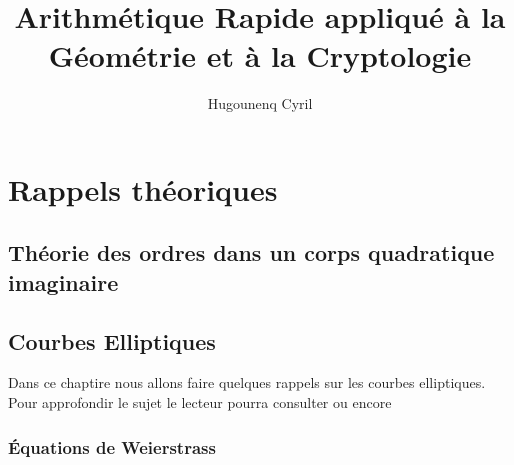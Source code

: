 \documentclass[10pt,a4paper]{book}
\author{Hugounenq Cyril}
\title{Arithmétique Rapide appliqué à la Géométrie et à la Cryptologie}
\theoremstyle{plain}
\theoremstyle{definition}
\theoremstyle{definition}
\theoremstyle{definition}
\theoremstyle{definition}
\theoremstyle{remark}
\theoremstyle{remark}
\begin{document}
\fancyhf{}%
\fancyhead[L]{\nouppercase\leftmark}%
\fancyhead[R]{}
\fancyfoot[C]{\thepage}%
\fancyfoot[L]{}




\renewcommand{\headrulewidth}{1pt}%
\renewcommand{\headrule}{\hbox to\headwidth{%
  \color{orange}\leaders\hrule height \headrulewidth\hfill}}
  
\renewcommand{\footrulewidth}{1pt}%
\newcommand{\footrulecolor}{blue}


\setlength{\parskip}{-1pt plus 1pt}

\newcommand{\abstracttextfont}{\normalfont}




\normalsize

\mainmatter

\chapter{Rappels théoriques}



\section{Théorie des ordres dans un corps quadratique imaginaire}

\section{Courbes Elliptiques}

Dans ce chaptire nous allons faire quelques rappels sur les courbes elliptiques. Pour approfondir le sujet le lecteur pourra consulter \cite{Silv1} ou encore \cite{Washington:2008}

\subsection{\'Equations de Weierstrass}
\end{document}
